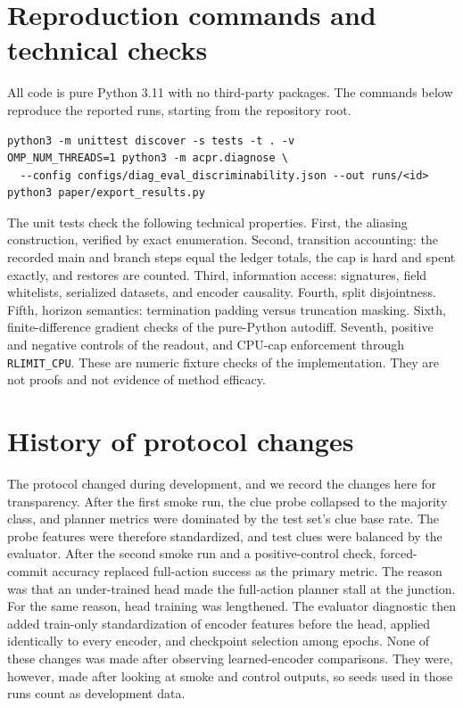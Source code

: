 \section{Reproduction commands and technical checks}
\label{app:repro}

All code is pure Python 3.11 with no third-party packages. The commands below reproduce the reported runs, starting from the repository root.
\begin{verbatim}
python3 -m unittest discover -s tests -t . -v
OMP_NUM_THREADS=1 python3 -m acpr.diagnose \
  --config configs/diag_eval_discriminability.json --out runs/<id>
python3 paper/export_results.py
\end{verbatim}

The unit tests check the following technical properties. First, the aliasing construction, verified by exact enumeration. Second, transition accounting: the recorded main and branch steps equal the ledger totals, the cap is hard and spent exactly, and restores are counted. Third, information access: signatures, field whitelists, serialized datasets, and encoder causality. Fourth, split disjointness. Fifth, horizon semantics: termination padding versus truncation masking. Sixth, finite-difference gradient checks of the pure-Python autodiff. Seventh, positive and negative controls of the readout, and CPU-cap enforcement through \texttt{RLIMIT\_CPU}. These are numeric fixture checks of the implementation. They are not proofs and not evidence of method efficacy.

\section{History of protocol changes}
\label{app:history}

The protocol changed during development, and we record the changes here for transparency. After the first smoke run, the clue probe collapsed to the majority class, and planner metrics were dominated by the test set's clue base rate. The probe features were therefore standardized, and test clues were balanced by the evaluator. After the second smoke run and a positive-control check, forced-commit accuracy replaced full-action success as the primary metric. The reason was that an under-trained head made the full-action planner stall at the junction. For the same reason, head training was lengthened. The evaluator diagnostic then added train-only standardization of encoder features before the head, applied identically to every encoder, and checkpoint selection among \DiagCfgHeadEpochs{} epochs. None of these changes was made after observing learned-encoder comparisons. They were, however, made after looking at smoke and control outputs, so seeds used in those runs count as development data.

